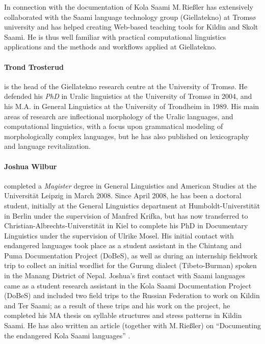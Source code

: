 \documentclass[a4paper,12pt]{article}
\begin{document}
{{{{In connection with the documentation of Kola Saami M.\,Rießler has extensively collaborated with the Saami language technology group (Giellatekno) at Tromsø university and has helped creating Web-based teaching tools for Kildin and Skolt Saami. He is thus well familiar with practical computational linguistics applications and the methods and workflows applied at Giellatekno.

\paragraph{Trond Trosterud} is the head of the Giellatekno research centre at the University of Tromsø. He defended his \textit{PhD} in Uralic linguistics at the University of Tromsø in 2004, and his M.A. in General Linguistics at the University of Trondheim in 1989. His main areas of research are inflectional morphology of the Uralic languages, and computational linguistics, with a focus upon grammatical modeling of morphologically complex languages, but he has also published on lexicography and language revitalization. 

\paragraph{Joshua Wilbur} completed a \textit{Magister} degree in General Linguistics and American Studies at the Universität Leipzig in March 2008. Since April 2008, he has been a doctoral student, initially at the General Linguistics department at Humboldt-Universtität in Berlin under the supervision of Manfred Krifka, but has now transferred to Christian-Albrechts-Universtität in Kiel to complete his PhD in Documentary Linguistics under the supervision of Ulrike Mosel. His initial contact with endangered languages took place as a student assistant in the Chintang and Puma Documentation Project (DoBeS), as well as during an internship fieldwork trip to collect an initial wordlist for the Gurung dialect (Tibeto-Burman) spoken in the Manang District of Nepal. Joshua's first contact with Saami languages came as a student research assistant in the Kola Saami Documentation Project (DoBeS) and included two field trips to the Russian Federation to work on Kildin and Ter Saami; as a result of these trips and his work on the project, he completed his MA thesis on syllable structures and stress patterns in Kildin Saami. He has also written an article (together with M.\,Rießler) on “Documenting the endangered {K}ola {S}aami languages” \citep{riesler-etal2007}.

}}}}
\end{document}
